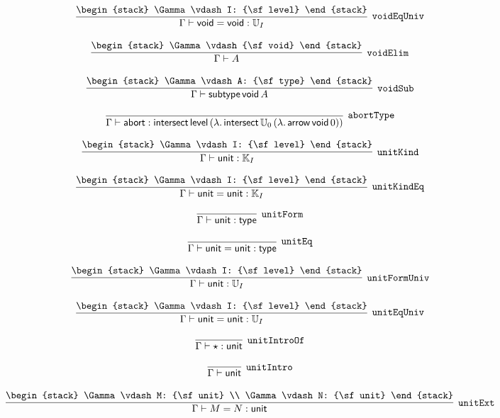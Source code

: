 \[
\infer[{\tt voidEqUniv}]{\Gamma \vdash {\sf void}= {\sf void}: {\Bbb U}_{I}}{
\begin{stack}
\Gamma \vdash I: {\sf level}
\end{stack}}
\]

\[
\infer[{\tt voidElim}]{\Gamma \vdash A}{
\begin{stack}
\Gamma \vdash {\sf void}
\end{stack}}
\]

\[
\infer[{\tt voidSub}]{\Gamma \vdash {\sf subtype}\,{\sf void}\,A}{
\begin{stack}
\Gamma \vdash A: {\sf type}
\end{stack}}
\]

\[
\infer[{\tt abortType}]{\Gamma \vdash {\sf abort}: {\sf intersect}\,{\sf level}\,(\lambda .\,{\sf intersect}\,{\Bbb U}_{0}\,(\lambda .\,{\sf arrow}\,{\sf void}\,0))}{}
\]

\[
\infer[{\tt unitKind}]{\Gamma \vdash {\sf unit}: {\Bbb K}_{I}}{
\begin{stack}
\Gamma \vdash I: {\sf level}
\end{stack}}
\]

\[
\infer[{\tt unitKindEq}]{\Gamma \vdash {\sf unit}= {\sf unit}: {\Bbb K}_{I}}{
\begin{stack}
\Gamma \vdash I: {\sf level}
\end{stack}}
\]

\[
\infer[{\tt unitForm}]{\Gamma \vdash {\sf unit}: {\sf type}}{}
\]

\[
\infer[{\tt unitEq}]{\Gamma \vdash {\sf unit}= {\sf unit}: {\sf type}}{}
\]

\[
\infer[{\tt unitFormUniv}]{\Gamma \vdash {\sf unit}: {\Bbb U}_{I}}{
\begin{stack}
\Gamma \vdash I: {\sf level}
\end{stack}}
\]

\[
\infer[{\tt unitEqUniv}]{\Gamma \vdash {\sf unit}= {\sf unit}: {\Bbb U}_{I}}{
\begin{stack}
\Gamma \vdash I: {\sf level}
\end{stack}}
\]

\[
\infer[{\tt unitIntroOf}]{\Gamma \vdash \star : {\sf unit}}{}
\]

\[
\infer[{\tt unitIntro}]{\Gamma \vdash {\sf unit}}{}
\]

\[
\infer[{\tt unitExt}]{\Gamma \vdash M= N: {\sf unit}}{
\begin{stack}
\Gamma \vdash M: {\sf unit}
\\
\Gamma \vdash N: {\sf unit}
\end{stack}}
\]

